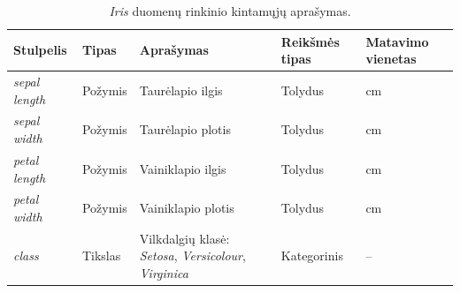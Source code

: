 \begin{table}[H]
    \centering
    \caption{\textit{Iris} duomenų rinkinio kintamųjų aprašymas.}
    \begin{tabular}{|l|l|l|l|l|}
        \hline
        \textbf{Stulpelis} & \textbf{Tipas} & \textbf{Aprašymas} & \textbf{Reikšmės tipas} & \textbf{Matavimo vienetas} \\
        \hline
        \textit{sepal length} & Požymis & Taurėlapio ilgis & Tolydus & cm \\ \hline
        \textit{sepal width} & Požymis & Taurėlapio plotis & Tolydus & cm \\ \hline
        \textit{petal length} & Požymis & Vainiklapio ilgis & Tolydus & cm \\ \hline
        \textit{petal width} & Požymis & Vainiklapio plotis & Tolydus & cm \\ \hline
        \textit{class} & Tikslas & Vilkdalgių klasė: \textit{Setosa}, \textit{Versicolour}, \textit{Virginica} & Kategorinis & -- \\ \hline
    \end{tabular}
    \label{tab:iris_kintamieji}
\end{table}
